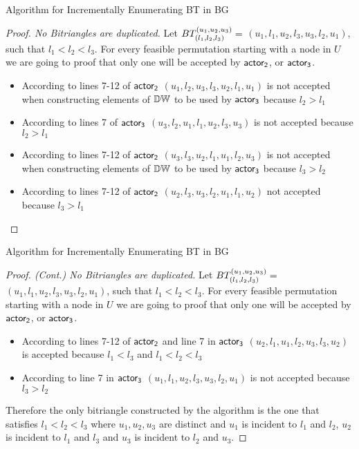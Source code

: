 \iffalse
\begin{frame}[fragile]{Algorithm for Incrementally Enumerating BT in BG}
  \begin{proof}[Proof. No Bitriangles are duplicated]   
  Let $BT_{(l_1, l_2,l_3)}^{(u_1, u_2, u_3)} =$  $(u_1,l_1,u_2,l_3,u_3,l_2,u_1)$, such that $l_1 < l_2 <l_3$. For every feasible permutation  starting with a node in $U$ we are going to proof that only one will be accepted by $\mathsf{actor_2}$, or $\mathsf{actor_3}$.  
  \begin{itemize}
        \item According to lines 7-12 of $\mathsf{actor_2}$ $(u_1,l_2,u_3,l_3,u_2,l_1,u_1)$ is  not accepted  when constructing elements of $\mathbb{DW}$ to be used by $\mathsf{actor_3}$  because $l_2 > l_1$ 
        \item According to lines 7 of $\mathsf{actor_3}$ $(u_3,l_2,u_1,l_1,u_2,l_3,u_3)$ is not accepted because $l_2 > l_1$
        \item According to lines 7-12 of $\mathsf{actor_2}$ $(u_3,l_3,u_2,l_1,u_1,l_2,u_3)$ is  not accepted  when constructing elements of $\mathbb{DW}$ to be used by $\mathsf{actor_3}$  because  $l_3 > l_2$
        \item According to lines 7-12 of $\mathsf{actor_2}$ $(u_2,l_3,u_3,l_2,u_1,l_1,u_2)$ not accepted because $l_3 > l_1 $
  \end{itemize}
  \end{proof}  
\end{frame}

\begin{frame}[fragile]{Algorithm for Incrementally Enumerating BT in BG}
  \begin{proof}[Proof. (Cont.) No Bitriangles are duplicated]   
  Let $BT_{(l_1, l_2,l_3)}^{(u_1, u_2, u_3)} =$  $(u_1,l_1,u_2,l_3,u_3,l_2,u_1)$, such that $l_1 < l_2 <l_3$. For every feasible permutation  starting with a node in $U$ we are going to proof that only one will be accepted by $\mathsf{actor_2}$, or $\mathsf{actor_3}$.  
  \begin{itemize}
        \item According to lines 7-12 of $\mathsf{actor_2}$ and line 7 in $\mathsf{actor_3}$ $(u_2,l_1,u_1,l_2,u_3,l_3,u_2)$ is accepted because $l_1 < l_3 $ and $l_1 < l_2 <l_3$ 
        \item According to  line 7 in $\mathsf{actor_3}$ $(u_1, l_1,u_2,l_3,u_3,l_2,u_1)$ is not accepted because $l_3 > l_2$
  \end{itemize}
  Therefore the  only bitriangle  constructed by the algorithm is the one that satisfies $l_1 < l_2 < l_3$ where $u_1,u_2,u_3$  are distinct and $u_1$ is incident to $l_1$ and $l_2$, $u_2$ is incident to $l_1$ and $l_3$ and $u_3$ is incident to $l_2$ and $u_3$.
  \end{proof}  
\end{frame}


